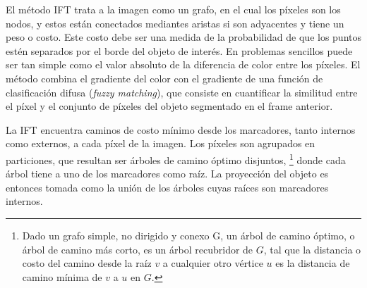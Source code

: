 El método IFT trata a la imagen como un grafo, en el cual los píxeles son los
nodos, y estos están conectados mediantes aristas si son adyacentes y tiene un
peso o costo. Este costo debe ser una medida de la probabilidad de que los
puntos estén separados por el borde del objeto de interés. En problemas
sencillos puede ser tan simple como el valor absoluto de la diferencia de color
entre los píxeles. El método combina el gradiente del color con el gradiente de
una función de clasificación difusa (\textit{fuzzy matching}), que consiste en
cuantificar la similitud entre el píxel y el conjunto de píxeles del objeto
segmentado en el frame anterior.

La IFT encuentra caminos de costo mínimo desde los marcadores, tanto internos
como externos, a cada píxel de la imagen. Los píxeles son agrupados en
particiones, que resultan ser árboles de camino óptimo disjuntos,
\footnote{Dado un grafo simple, no dirigido y conexo G, un árbol de camino
  óptimo, o árbol de camino más corto, es un árbol recubridor de $G$, tal que
  la distancia o costo del camino desde la raíz $v$ a cualquier otro vértice
$u$ es la distancia de camino mínima de $v$ a $u$ en $G$.} donde cada árbol
tiene a uno de los marcadores como raíz. La proyección del objeto es entonces
tomada como la unión de los árboles cuyas raíces son marcadores internos.


